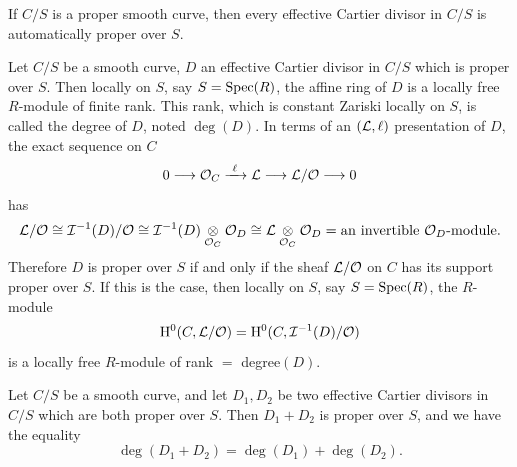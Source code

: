 \begin{remark}\label{rem:1.2.4}
If $C/S$ is a proper smooth curve, then every effective Cartier divisor in $C/S$ is automatically proper over $S$.
\end{remark}

\begin{definition}\label{def:1.2.5}
Let $C/S$ be a smooth curve, $D$ an effective Cartier divisor in $C/S$ which is proper over $S$. Then locally on $S$, say $S = \operatorname{Spec}(R)$, the affine ring of $D$ is a locally free $R$-module of finite rank. This rank, which is constant Zariski locally on $S$, is called the degree of $D$, noted $\deg(D)$. In terms of an $(\mathcal{L}, \ell)$ presentation of $D$, the exact sequence on $C$
\[
0 \longrightarrow \cO_C \xrightarrow{\ \ell\ } \cL \longrightarrow \cL/\cO \longrightarrow 0
\]
has
\[
\resizebox{\linewidth}{!}{$\displaystyle
\cL/\cO \cong \cI^{-1}(D)/\cO \cong \cI^{-1}(D) \tens{\cO_C} \cO_D \cong \cL \tens{\cO_C} \cO_D = \text{an invertible } \cO_D\text{-module}.
$}
\]
Therefore $D$ is proper over $S$ if and only if the sheaf $\mathcal{L}/\mathcal{O}$ on $C$ has its support proper over $S$. If this is the case, then locally on $S$, say $S = \operatorname{Spec}(R)$, the $R$-module
\[
\mathrm{H}^0(C, \mathcal{L}/\mathcal{O}) = \mathrm{H}^0(C, \mathcal{I}^{-1}(D)/\mathcal{O})
\]
is a locally free $R$-module of rank $=$ degree$(D)$.
\end{definition}

\begin{lemma}\label{lem:1.2.6}
Let $C/S$ be a smooth curve, and let $D_1, D_2$ be two effective Cartier divisors in $C/S$ which are both proper over $S$. Then $D_1 + D_2$ is proper over $S$, and we have the equality
\[
\deg(D_1 + D_2) = \deg(D_1) + \deg(D_2).
\]
\end{lemma}

